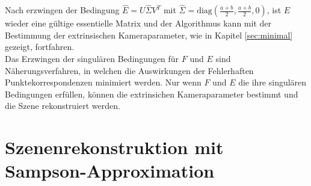 Nach erzwingen der Bedingung $\hat{E} = U \hat{\Sigma}V^T$ mit $\hat{\Sigma} = \text{diag}(\frac{a+b}{2},\frac{a+b}{2},0)$, ist $E$ wieder eine gültige essentielle Matrix und der Algorithmus kann mit der Bestimmung der extrinsischen Kameraparameter, wie in Kapitel \ref{sec:minimal} gezeigt, fortfahren.\\

Das Erzwingen der singulären Bedingungen für $F$ und $E$ sind Näherungsverfahren, in welchen die Auswirkungen der Fehlerhaften Punktekorrespondenzen minimiert werden. Nur wenn $F$ und $E$ die ihre singulären Bedingungen erfüllen, können die extrinsichen Kameraparameter bestimmt und die Szene rekonstruiert werden\cite{HZ}.



\section{Szenenrekonstruktion mit Sampson-Approximation}
\label{sec:sampson}

